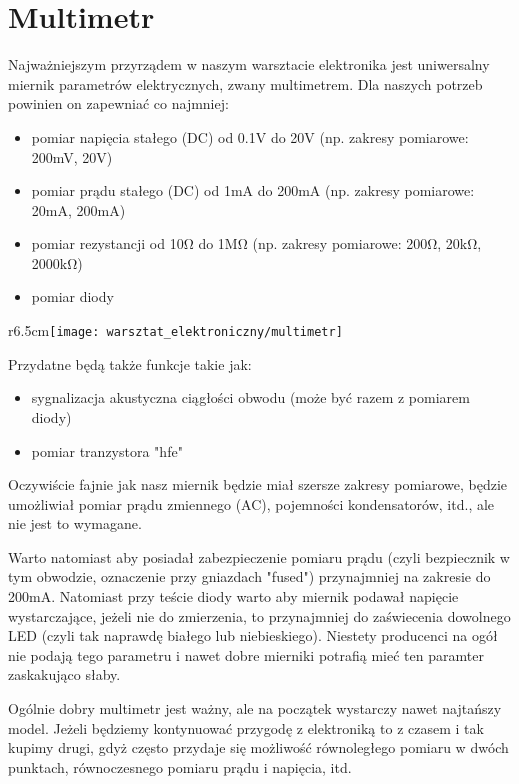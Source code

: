 \documentclass{pdfBooklets}
\begin{document}
\section{Multimetr}
	Najważniejszym przyrządem w naszym warsztacie elektronika jest uniwersalny miernik parametrów elektrycznych, zwany multimetrem.
	Dla naszych potrzeb powinien on zapewniać co najmniej:
	\begin{itemize}
		\item pomiar napięcia stałego (DC) od 0.1V do 20V (np. zakresy pomiarowe: 200mV, 20V)
		\item pomiar prądu stałego (DC) od 1mA do 200mA (np. zakresy pomiarowe: 20mA, 200mA)
		\item pomiar rezystancji od 10Ω do 1MΩ (np. zakresy pomiarowe: 200Ω, 20kΩ, 2000kΩ)
		\item pomiar diody
	\end{itemize}
	
	\begin{wrapfigure}{r}{6.5cm}\texttt{[image: warsztat\_elektroniczny/multimetr]}\vspace{-1.2cm}\end{wrapfigure}
	\noindent
	Przydatne będą także funkcje takie jak:
	\begin{itemize}
		\item  sygnalizacja akustyczna ciągłości obwodu (może być razem z pomiarem diody)
		\item pomiar tranzystora "hfe"
	\end{itemize}
	Oczywiście fajnie jak nasz miernik będzie miał szersze zakresy pomiarowe, będzie umożliwiał pomiar prądu zmiennego (AC), pojemności kondensatorów, itd., ale nie jest to wymagane.
	
	Warto natomiast aby posiadał zabezpieczenie pomiaru prądu (czyli bezpiecznik w tym obwodzie, oznaczenie przy gniazdach "fused") przynajmniej na zakresie do 200mA.
	Natomiast przy teście diody warto aby miernik podawał napięcie wystarczające, jeżeli nie do zmierzenia, to przynajmniej do zaświecenia dowolnego LED (czyli tak naprawdę białego lub niebieskiego).
		Niestety producenci na ogół nie podają tego parametru i nawet dobre mierniki potrafią mieć ten paramter zaskakująco słaby.
	
	Ogólnie dobry multimetr jest ważny, ale na początek wystarczy nawet najtańszy model. Jeżeli będziemy kontynuować przygodę z elektroniką to z czasem i tak kupimy drugi, gdyż często przydaje się możliwość równoległego pomiaru w dwóch punktach, równoczesnego pomiaru prądu i napięcia, itd.
	
\end{document}

